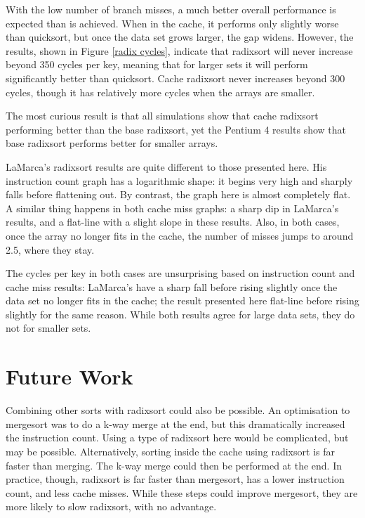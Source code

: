 With the low number of branch misses, a much better overall performance is
expected than is achieved. When in the cache, it performs only slightly worse
than quicksort, but once the data set grows larger, the gap widens.  However,
the results, shown in Figure \ref{radix cycles}, indicate that radixsort will
never increase beyond 350 cycles per key, meaning that for larger sets it will
perform significantly better than quicksort. Cache radixsort never increases
beyond 300 cycles, though it has relatively more cycles when the arrays are
smaller. 

The most curious result is that all simulations show that cache radixsort
performing better than the base radixsort, yet the Pentium 4 results show that
base radixsort performs better for smaller arrays.

LaMarca's radixsort results are quite different to those presented here. His
instruction count graph has a logarithmic shape: it begins very high and sharply
falls before flattening out. By contrast, the graph here is almost completely
flat. A similar thing happens in both cache miss graphs: a sharp dip in
LaMarca's results, and a flat-line with a slight slope in these results. Also,
in both cases, once the array no longer fits in the cache, the number of misses
jumps to around 2.5, where they stay. 

The cycles per key in both cases are unsurprising based on instruction count and
cache miss results: LaMarca's have a sharp fall before rising slightly once the
data set no longer fits in the cache; the result presented here flat-line before rising
slightly for the same reason. While both results agree for large data sets, they do not
for smaller sets.

\section{Future Work}
\label{radix future work}
Combining other sorts with radixsort could also be possible. An optimisation to
mergesort was to do a k-way merge at the end, but this dramatically increased
the instruction count. Using a type of radixsort here would be complicated, but
may be possible. Alternatively, sorting inside the cache using radixsort is far
faster than merging. The k-way merge could then be performed at the end. In
practice, though, radixsort is far faster than mergesort, has a lower
instruction count, and less cache misses. While these steps could improve
mergesort, they are more likely to slow radixsort, with no advantage.

